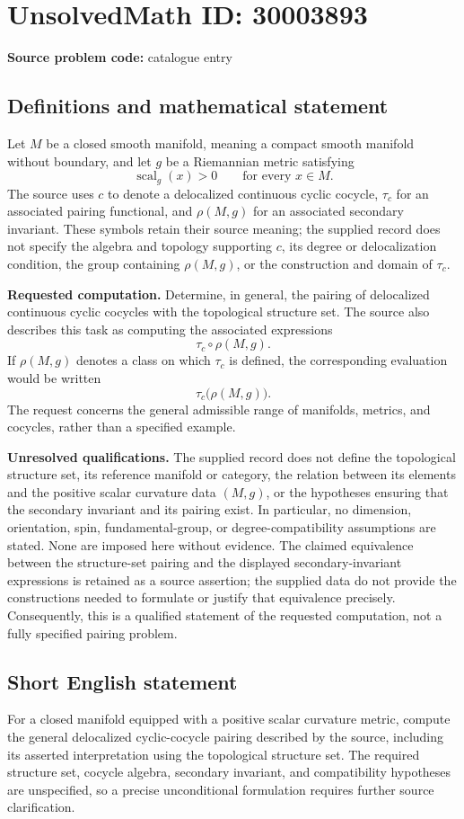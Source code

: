 \documentclass[11pt]{article}
\begin{document}
\section*{UnsolvedMath ID: 30003893}
\textbf{Source problem code:} catalogue entry
\subsection{Definitions and mathematical statement}
Let \(M\) be a closed smooth manifold, meaning a compact smooth manifold without boundary, and let \(g\) be a Riemannian metric satisfying
\[
\operatorname{scal}_g(x)>0\qquad\text{for every }x\in M.
\]
The source uses \(c\) to denote a delocalized continuous cyclic cocycle, \(\tau_c\) for an associated pairing functional, and \(\rho(M,g)\) for an associated secondary invariant. These symbols retain their source meaning; the supplied record does not specify the algebra and topology supporting \(c\), its degree or delocalization condition, the group containing \(\rho(M,g)\), or the construction and domain of \(\tau_c\).

\textbf{Requested computation.} Determine, in general, the pairing of delocalized continuous cyclic cocycles with the topological structure set. The source also describes this task as computing the associated expressions
\[
\tau_c\circ\rho(M,g).
\]
If \(\rho(M,g)\) denotes a class on which \(\tau_c\) is defined, the corresponding evaluation would be written
\[
\tau_c\bigl(\rho(M,g)\bigr).
\]
The request concerns the general admissible range of manifolds, metrics, and cocycles, rather than a specified example.

\textbf{Unresolved qualifications.} The supplied record does not define the topological structure set, its reference manifold or category, the relation between its elements and the positive scalar curvature data \((M,g)\), or the hypotheses ensuring that the secondary invariant and its pairing exist. In particular, no dimension, orientation, spin, fundamental-group, or degree-compatibility assumptions are stated. None are imposed here without evidence. The claimed equivalence between the structure-set pairing and the displayed secondary-invariant expressions is retained as a source assertion; the supplied data do not provide the constructions needed to formulate or justify that equivalence precisely. Consequently, this is a qualified statement of the requested computation, not a fully specified pairing problem.
\subsection{Short English statement}
For a closed manifold equipped with a positive scalar curvature metric, compute the general delocalized cyclic-cocycle pairing described by the source, including its asserted interpretation using the topological structure set. The required structure set, cocycle algebra, secondary invariant, and compatibility hypotheses are unspecified, so a precise unconditional formulation requires further source clarification.
\end{document}
